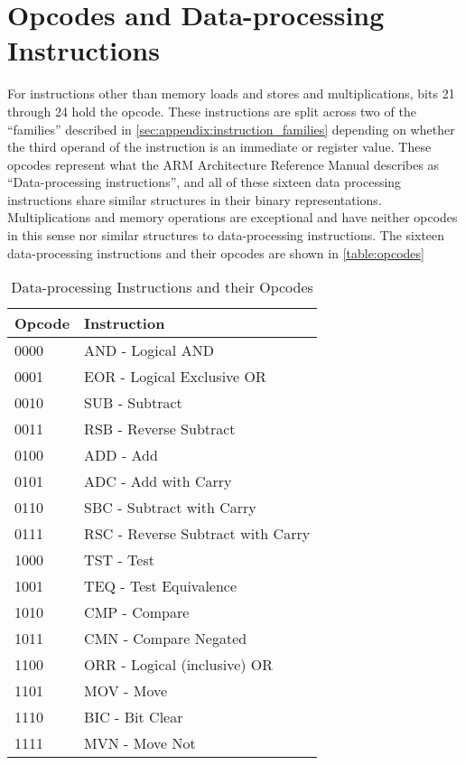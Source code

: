 \section{Opcodes and Data-processing Instructions}
\label{sec:appendix:opcodes}

For instructions other than memory loads and stores and multiplications, bits 21 through 24 hold the opcode. These instructions are split across two of the ``families'' described in \autoref{sec:appendix:instruction_families} depending on whether the third operand of the instruction is an immediate or register value. These opcodes represent what the ARM Architecture Reference Manual describes as ``Data-processing instructions''\citep[pp. A3-7]{armarm:2005}, and all of these sixteen data processing instructions share similar structures in their binary representations. Multiplications and memory operations are exceptional and have neither opcodes in this sense nor similar structures to data-processing instructions. The sixteen data-processing instructions and their opcodes are shown in \autoref{table:opcodes}

\begin{table}
  \caption{Data-processing Instructions and their Opcodes\citep[pp. A3-7]{armarm:2005}}
  \label{table:opcodes}
  \begin{tabularx}{\textwidth}{l|l}
  Opcode & Instruction \\ \hline
  0000 & AND - Logical AND \\ \hline
  0001 & EOR - Logical Exclusive OR \\ \hline
  0010 & SUB - Subtract \\ \hline
  0011 & RSB - Reverse Subtract \\ \hline
  0100 & ADD - Add \\ \hline
  0101 & ADC - Add with Carry \\ \hline
  0110 & SBC - Subtract with Carry \\ \hline
  0111 & RSC - Reverse Subtract with Carry \\ \hline
  1000 & TST - Test \\ \hline
  1001 & TEQ - Test Equivalence \\ \hline
  1010 & CMP - Compare \\ \hline
  1011 & CMN - Compare Negated \\ \hline
  1100 & ORR - Logical (inclusive) OR \\ \hline
  1101 & MOV - Move \\ \hline
  1110 & BIC - Bit Clear \\ \hline
  1111 & MVN - Move Not
\end{tabularx}
\end{table}


